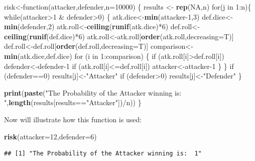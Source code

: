 \documentclass[]{book}
\newenvironment{Shaded}{\begin{snugshade}}{\end{snugshade}}
\newcommand{\KeywordTok}[1]{\textcolor[rgb]{0.13,0.29,0.53}{\textbf{{#1}}}}
\newcommand{\DataTypeTok}[1]{\textcolor[rgb]{0.13,0.29,0.53}{{#1}}}
\newcommand{\DecValTok}[1]{\textcolor[rgb]{0.00,0.00,0.81}{{#1}}}
\newcommand{\StringTok}[1]{\textcolor[rgb]{0.31,0.60,0.02}{{#1}}}
\newcommand{\OtherTok}[1]{\textcolor[rgb]{0.56,0.35,0.01}{{#1}}}
\newcommand{\NormalTok}[1]{{#1}}
\begin{document}
\begin{Shaded}
\begin{Highlighting}[]
\NormalTok{risk<-function(attacker,defender,}\DataTypeTok{n=}\DecValTok{10000}\NormalTok{) \{}
  \NormalTok{results <-}\StringTok{ }\KeywordTok{rep}\NormalTok{(}\OtherTok{NA}\NormalTok{,n)}
\NormalTok{for(j in }\DecValTok{1}\NormalTok{:n)\{}
\NormalTok{while(attacker>}\DecValTok{1} \NormalTok{&}\StringTok{ }\NormalTok{defender>}\DecValTok{0}\NormalTok{) \{}
 \NormalTok{atk.dice<-}\KeywordTok{min}\NormalTok{(attacker}\DecValTok{-1}\NormalTok{,}\DecValTok{3}\NormalTok{)}
 \NormalTok{def.dice<-}\KeywordTok{min}\NormalTok{(defender,}\DecValTok{2}\NormalTok{)}
 \NormalTok{atk.roll<-}\KeywordTok{ceiling}\NormalTok{(}\KeywordTok{runif}\NormalTok{(atk.dice)*}\DecValTok{6}\NormalTok{)}
 \NormalTok{def.roll<-}\KeywordTok{ceiling}\NormalTok{(}\KeywordTok{runif}\NormalTok{(def.dice)*}\DecValTok{6}\NormalTok{)}
 \NormalTok{atk.roll<-atk.roll[}\KeywordTok{order}\NormalTok{(atk.roll,}\DataTypeTok{decreasing=}\NormalTok{T)]}
 \NormalTok{def.roll<-def.roll[}\KeywordTok{order}\NormalTok{(def.roll,}\DataTypeTok{decreasing=}\NormalTok{T)]}
 \NormalTok{comparison<-}\KeywordTok{min}\NormalTok{(atk.dice,def.dice)}
 \NormalTok{for (i in }\DecValTok{1}\NormalTok{:comparison) \{}
  \NormalTok{if (atk.roll[i]>def.roll[i]) defender<-defender}\DecValTok{-1}
  \NormalTok{if (atk.roll[i]<=def.roll[i]) attacker<-attacker}\DecValTok{-1}
 \NormalTok{\}}
\NormalTok{\}}
\NormalTok{if (defender==}\DecValTok{0}\NormalTok{) results[j]<-}\StringTok{"Attacker"}
\NormalTok{if (defender>}\DecValTok{0}\NormalTok{) results[j]<-}\StringTok{"Defender"}
\NormalTok{\}}

\KeywordTok{print}\NormalTok{(}\KeywordTok{paste}\NormalTok{(}\StringTok{"The Probability of the Attacker winning is: "}\NormalTok{,}\KeywordTok{length}\NormalTok{(results[results==}\StringTok{"Attacker"}\NormalTok{])/n))}
\NormalTok{\}}
\end{Highlighting}
\end{Shaded}

Now will illustrate how this function is used:

\begin{Shaded}
\begin{Highlighting}[]
\KeywordTok{risk}\NormalTok{(}\DataTypeTok{attacker=}\DecValTok{12}\NormalTok{,}\DataTypeTok{defender=}\DecValTok{6}\NormalTok{)}
\end{Highlighting}
\end{Shaded}

\begin{verbatim}
## [1] "The Probability of the Attacker winning is:  1"
\end{verbatim}
\end{document}
